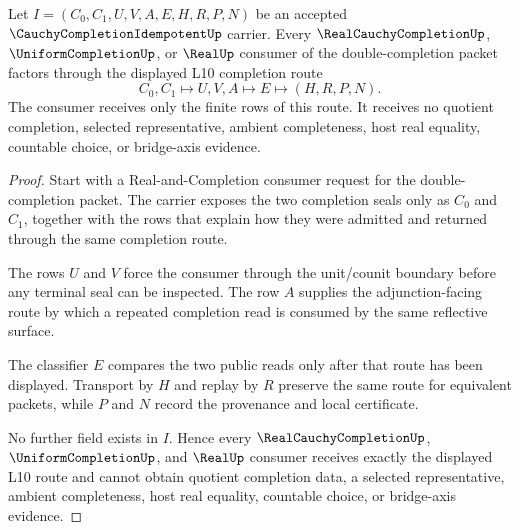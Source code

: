 \begin{theorem}
\label{thm:cauchy-completion-idempotent-real-completion-handoff}
Let $I=(C_0,C_1,U,V,A,E,H,R,P,N)$ be an accepted $\CauchyCompletionIdempotentUp$ carrier. Every $\RealCauchyCompletionUp$, $\UniformCompletionUp$, or $\RealUp$ consumer of the double-completion packet factors through the displayed L10 completion route
$$
C_0,C_1\longmapsto U,V,A\longmapsto E\longmapsto(H,R,P,N).
$$
The consumer receives only the finite rows of this route. It receives no quotient completion, selected representative, ambient completeness, host real equality, countable choice, or bridge-axis evidence.
\end{theorem}
\begin{proof}
Start with a Real-and-Completion consumer request for the double-completion packet. The carrier exposes the two completion seals only as $C_0$ and $C_1$, together with the rows that explain how they were admitted and returned through the same completion route.

The rows $U$ and $V$ force the consumer through the unit/counit boundary before any terminal seal can be inspected. The row $A$ supplies the adjunction-facing route by which a repeated completion read is consumed by the same reflective surface.

The classifier $E$ compares the two public reads only after that route has been displayed. Transport by $H$ and replay by $R$ preserve the same route for equivalent packets, while $P$ and $N$ record the provenance and local certificate.

No further field exists in $I$. Hence every $\RealCauchyCompletionUp$, $\UniformCompletionUp$, and $\RealUp$ consumer receives exactly the displayed L10 route and cannot obtain quotient completion data, a selected representative, ambient completeness, host real equality, countable choice, or bridge-axis evidence.
\end{proof}

